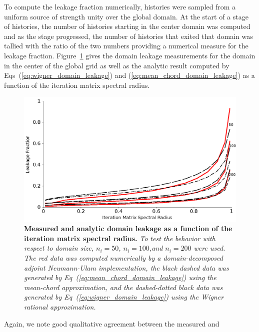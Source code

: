 To compute the leakage fraction numerically,  histories were
sampled from a uniform source of strength unity over the global
domain. At the start of a stage of histories, the number of histories
starting in the center domain was computed and as the stage
progressed, the number of histories that exited that domain was
tallied with the ratio of the two numbers providing a numerical
measure for the leakage fraction. Figure~\ref{fig:measured_leakage}
gives the domain leakage measurements for the domain in the center of
the global grid as well as the analytic result computed by
Eqs~(\ref{eq:wigner_domain_leakage}) and
(\ref{eq:mean_chord_domain_leakage}) as a function of the iteration
matrix spectral radius.
\begin{figure}[t!]
  \begin{spacing}{1.0}
    \begin{center}
      \includegraphics[width=6.0in,clip]{chapters/parallel_mc/leakage_variation_2.pdf}
    \end{center}
    \caption{\textbf{Measured and analytic domain leakage as a
        function of the iteration matrix spectral radius.} \textit{To
        test the behavior with respect to domain size, $n_i=50$,
        $n_i=100$,and $n_i=200$ were used. The red data was computed
        numerically by a domain-decomposed adjoint Neumann-Ulam
        implementation, the black dashed data was generated by
        Eq~(\ref{eq:mean_chord_domain_leakage}) using the mean-chord
        approximation, and the dashed-dotted black data was generated
        by Eq~(\ref{eq:wigner_domain_leakage}) using the Wigner
        rational approximation.}}
    \label{fig:measured_leakage}
  \end{spacing}
\end{figure}
Again, we note good qualitative agreement between the measured and
